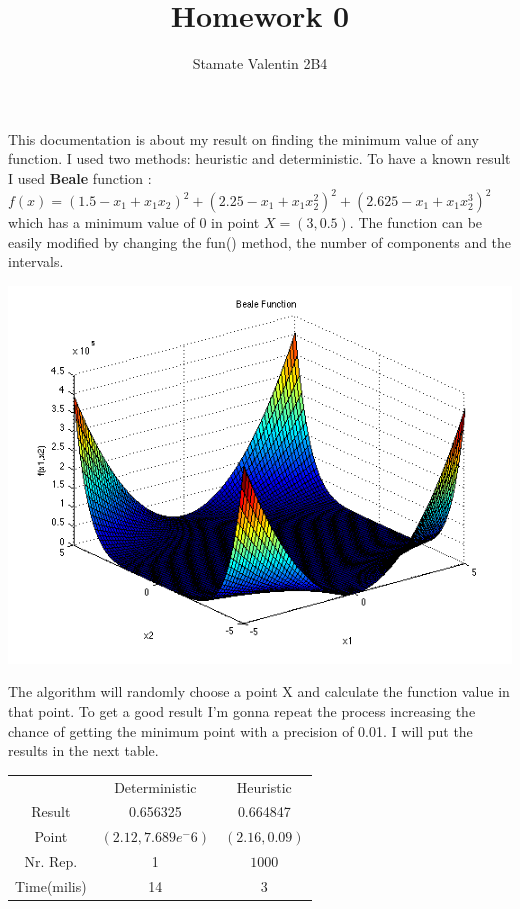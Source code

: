 \documentclass[12pt]{article}
\title{Homework 0}
\author{Stamate Valentin 2B4}
\begin{document}
\maketitle

  This documentation is about my result on finding the minimum value of any 
function. I used two methods: heuristic and deterministic. To have a known result
I used \textbf{Beale} function : \( f(x) = (1.5 - x_1 + x_1x_2)^2 + (2.25 - x_1 + x_1x_2^2)^2 + (2.625 - x_1 + x_1x_2^3)^2 \)
which has a minimum value of 0 in point \( X = (3, 0.5) \). The function can be easily modified by changing the fun() method, the number of components and the intervals.

\begin{center}
  \includegraphics[scale=0.6]{beale.png}
\end{center}


  The algorithm will randomly choose a point X and calculate the function value in that point. To get a good result I'm gonna repeat the
process increasing the chance of getting the minimum point with a precision of 0.01. I will put the results in the next table.

\begin{center}
  \begin{tabular}{ c c c }
    & Deterministic & Heuristic \\ 
    Result & 0.656325 & 0.664847 \\  
   Point & \( (2.12, 7.689e^-6) \) & \( (2.16, 0.09) \) \\    
   Nr. Rep. & 1 & \( 1000 \) \\    
   Time(milis) & 14 & 3
  \end{tabular}
\end{center}
\end{document}

